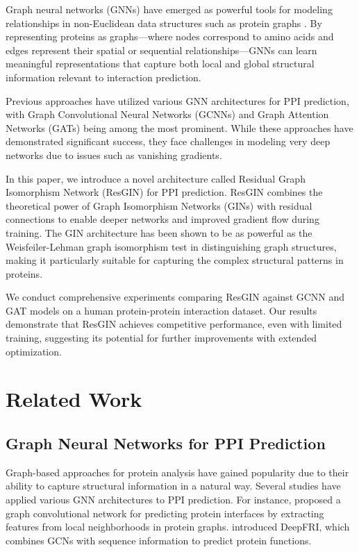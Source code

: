 \documentclass[conference]{IEEEtran}
\begin{document}
Graph neural networks (GNNs) have emerged as powerful tools for modeling relationships in non-Euclidean data structures such as protein graphs \cite{gainza2020deciphering}. By representing proteins as graphs—where nodes correspond to amino acids and edges represent their spatial or sequential relationships—GNNs can learn meaningful representations that capture both local and global structural information relevant to interaction prediction.

Previous approaches have utilized various GNN architectures for PPI prediction, with Graph Convolutional Neural Networks (GCNNs) \cite{kipf2017semi} and Graph Attention Networks (GATs) \cite{velivckovic2018graph} being among the most prominent. While these approaches have demonstrated significant success, they face challenges in modeling very deep networks due to issues such as vanishing gradients.

In this paper, we introduce a novel architecture called Residual Graph Isomorphism Network (ResGIN) for PPI prediction. ResGIN combines the theoretical power of Graph Isomorphism Networks (GINs) \cite{xu2018powerful} with residual connections \cite{he2016deep} to enable deeper networks and improved gradient flow during training. The GIN architecture has been shown to be as powerful as the Weisfeiler-Lehman graph isomorphism test in distinguishing graph structures, making it particularly suitable for capturing the complex structural patterns in proteins.

We conduct comprehensive experiments comparing ResGIN against GCNN and GAT models on a human protein-protein interaction dataset. Our results demonstrate that ResGIN achieves competitive performance, even with limited training, suggesting its potential for further improvements with extended optimization.

\section{Related Work}
\subsection{Graph Neural Networks for PPI Prediction}
Graph-based approaches for protein analysis have gained popularity due to their ability to capture structural information in a natural way. Several studies have applied various GNN architectures to PPI prediction. For instance, \cite{fout2017protein} proposed a graph convolutional network for predicting protein interfaces by extracting features from local neighborhoods in protein graphs. \cite{gligorijevic2019structure} introduced DeepFRI, which combines GCNs with sequence information to predict protein functions.
\end{document}
